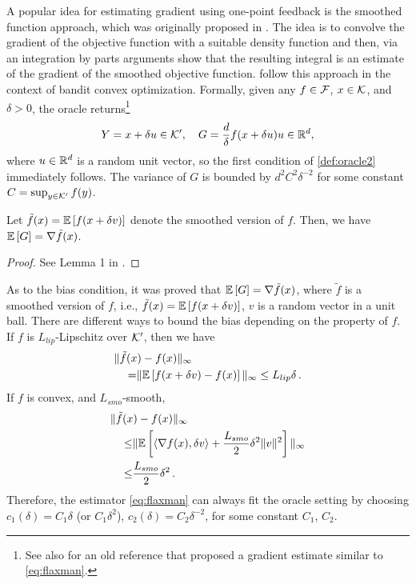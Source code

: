 A popular idea for estimating gradient using one-point feedback is the smoothed function approach, which was originally proposed in \citep{katkul}. The idea is to convolve the gradient of the objective function with a suitable density function and then, via an integration by parts arguments show that the resulting integral is an estimate of the gradient of the smoothed objective function. 
\cite{flaxman2005online} follow this approach in the context of bandit convex optimization.
Formally,  
given any $f \in \mathcal{F}$, $x \in \mathcal{K}$, and $\delta >0$, the oracle returns\footnote{See also \cite[pp.~58-60]{kushcla} for an old reference that proposed a gradient estimate similar to \eqref{eq:flaxman}.}   
\begin{align}
 Y = x+\delta u \in \mathcal{K}', \quad
 G = \dfrac{d}{\delta}f(x+\delta u)u \in \mathbb{R}^d, \label{eq:flaxman}
\end{align}
where $u\in \mathbb{R}^d$ is a random unit vector, so the first condition of \cref{def:oracle2} immediately follows. 
The variance of $G$ is bounded by $d^2C^2 \delta^{-2}$ for some constant $C = \sup_{y\in \mathcal{K}'}f(y)$. 
\begin{proposition}
Let $\tilde{f}(x) = \mathbb{E}\left[f(x+\delta v)\right]$ denote the smoothed version of $f$. Then, we have
$\mathbb{E}\left[G\right] = \nabla \tilde{f}(x)$.
\end{proposition}
\begin{proof}
 See Lemma 1 in \citep{flaxman2005online}.
\end{proof}
 As to the bias condition, it was proved that $\mathbb{E}\left[G\right] = \nabla \tilde{f}(x)$, where $\tilde{f}$ is a smoothed version of $f$, i.e.,
$\tilde{f}(x) = \mathbb{E}\left[f(x+\delta v)\right]$,
$v$ is a random vector in a unit ball. There are different ways to bound the bias depending on the property of $f$.
If $f$ is $L_{lip}$-Lipschitz over $\mathcal{K}'$, then we have
\begin{align*}
\MoveEqLeft
\norm{\tilde{f}(x)-f(x)}_\infty \\
=&\norm{\EE{f(x+\delta v)-f(x)}}_\infty
\le L_{lip} \delta \,.
\end{align*}
If $f$ is convex, and $L_{smo}$-smooth, 
\begin{align*}
\MoveEqLeft
\norm{\tilde{f}(x)-f(x)}_\infty \\
\le& \norm{\EE{\ip{\nabla f(x), \delta v}+\dfrac{L_{smo}}{2}\delta^2\norm{v}^2}}_\infty\\
\le &\dfrac{L_{smo}}{2}\delta^2 \,.
\end{align*}
Therefore, the estimator \eqref{eq:flaxman} can always fit the oracle setting by choosing $c_1(\delta) = C_1 \delta$ (or $C_1\delta^2$), $c_2(\delta) = C_2 \delta^{-2}$, for some constant $C_1$, $C_2$.

